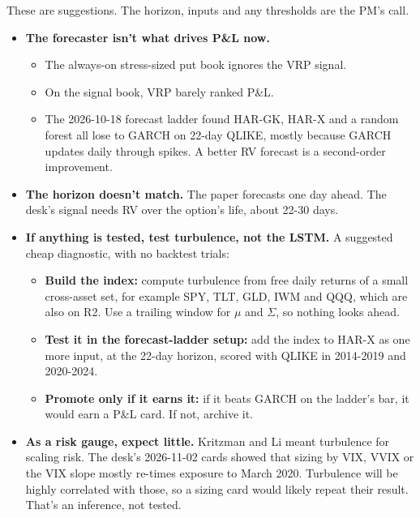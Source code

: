 \documentclass{article}
\begin{document}
These are suggestions. The horizon, inputs and any thresholds are the PM's call.

\begin{itemize}

\item \textbf{The forecaster isn't what drives P\&L now.}

\begin{itemize}

\item The always-on stress-sized put book ignores the VRP signal.

\item On the signal book, VRP barely ranked P\&L.

\item The 2026-10-18 forecast ladder found HAR-GK, HAR-X and a random forest all lose to GARCH on 22-day QLIKE, mostly because GARCH updates daily through spikes. A better RV forecast is a second-order improvement.

\end{itemize}

\item \textbf{The horizon doesn't match.} The paper forecasts one day ahead. The desk's signal needs RV over the option's life, about 22-30 days.

\item \textbf{If anything is tested, test turbulence, not the LSTM.} A suggested cheap diagnostic, with no backtest trials:

\begin{itemize}

\item \textbf{Build the index:} compute turbulence from free daily returns of a small cross-asset set, for example SPY, TLT, GLD, IWM and QQQ, which are also on R2. Use a trailing window for $\mu$ and $\Sigma$, so nothing looks ahead.

\item \textbf{Test it in the forecast-ladder setup:} add the index to HAR-X as one more input, at the 22-day horizon, scored with QLIKE in 2014-2019 and 2020-2024.

\item \textbf{Promote only if it earns it:} if it beats GARCH on the ladder's bar, it would earn a P\&L card. If not, archive it.

\end{itemize}

\item \textbf{As a risk gauge, expect little.} Kritzman and Li meant turbulence for scaling risk. The desk's 2026-11-02 cards showed that sizing by VIX, VVIX or the VIX slope mostly re-times exposure to March 2020. Turbulence will be highly correlated with those, so a sizing card would likely repeat their result. That's an inference, not tested.


\end{itemize}
\end{document}
